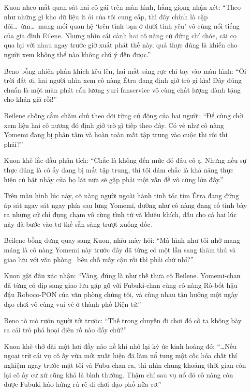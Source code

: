 \documentclass[../main.tex]{subfiles}
\begin{document}
Kuon nheo mắt quan sát hai cô gái trên màn hình, hắng giọng nhận xét: ``Theo như những gì kho dữ liệu ít ỏi của tôi cung cấp, thì đây chính là cặp đôi\dots\ ừm\dots\ mang mối quan hệ `trên tình bạn ở dưới tình yêu' vô cùng nổi tiếng của gia đình Eilene. Nhưng nhìn cái cảnh hai cô nàng cứ đứng chí chóe, cãi cọ qua lại với nhau ngay trước giờ xuất phát thế này, quả thực đúng là khiến cho người xem không thể nào không chú ý đến được.''

Beno bỗng nhiên phấn khích kêu lên, hai mắt sáng rực chỉ tay vào màn hình: ``Ôi trời đất ơi, hai người nhìn xem cô nàng Étra đang định giở trò gì kìa! Đây đúng chuẩn là một màn phát cẩu lương yuri fanservice vô cùng chất lượng dành tặng cho khán giả rồi!''

Beilene chống cằm chăm chú theo dõi từng cử động của hai người: ``Để cùng chờ xem liệu hai cô nương đó định giở trò gì tiếp theo đây. Có vẻ như cô nàng Yomemi đang bị phân tâm và hoàn toàn mất tập trung vào cuộc thi rồi thì phải?''

Kuon khẽ lắc đầu phân tích: ``Chắc là không đến mức đó đâu cô ạ. Nhưng nếu sự thực đúng là cô ấy đang bị mất tập trung, thì tôi dám chắc là khả năng thực hiện cú bật nhảy của họ lát nữa sẽ gặp phải một vấn đề vô cùng lớn đấy.''

Trên màn hình lúc này, cô nàng người ngoài hành tinh tóc tím Étra đang đứng áp sát ngay sát ngay phía sau lưng Yomemi, dường như cô nàng đang cố tình bày ra những cử chỉ đụng chạm vô cùng tình tứ và khiêu khích, dẫu cho cả hai lúc này đã bước vào tư thế sẵn sàng trượt xuống dốc.


Beilene bỗng dưng quay sang Kuon, nhíu mày hỏi: ``Mà hình như tôi nhớ mang máng là cô nàng Yomemi này trước đây đã từng có một lần sang thăm thú và giao lưu với văn phòng \hll\ bên chỗ mấy cậu rồi thì phải chứ nhỉ?''

Kuon gật đầu xác nhận: ``Vâng, đúng là như thế thưa cô Beilene. Yomemi-chan đã từng có dịp sang giao lưu gặp gỡ với Fubuki-chan cùng cô nàng Rô-bốt hậu đậu Roboco-PON của văn phòng chúng tôi, và cùng nhau tận hưởng một ngày dạo chơi vô cùng vui vẻ ở thành phố Điện tử.''

Beno tò mò rướn người tới trước: ``Thế trong chuyến đi chơi đó cô ta không bày ra cái trò phá hoại điên rồ nào đấy chứ?''

Kuon khẽ thở dài một hơi đầy não nề khi nhớ lại ký ức kinh hoàng đó: ``\dots Nếu ngoại trừ cái vụ cô ấy vừa mới xuất hiện đã làm nổ tung một cốc hóa chất thí nghiệm ngay trước mặt tôi và Fubu-chan ra, thì nhìn chung khoảng thời gian còn lại cô ấy cư xử cũng khá là bình thường. Thậm chí sau vụ nổ đó cô nàng còn được Fubuki hào hứng rủ rê đi chơi dạo phố nữa cơ.''
\end{document}
